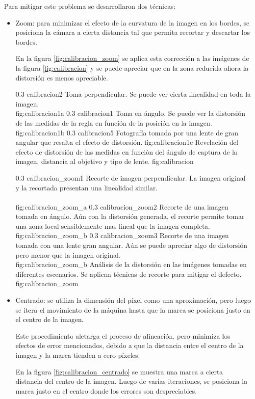 Para mitigar este problema se desarrollaron dos técnicas:
\begin{itemize}
\item{Zoom: para minimizar el efecto de la curvatura de la imagen en los bordes, se posiciona la cámara a cierta distancia tal que permita recortar y descartar los bordes.\par
      En la figura \ref{fig:calibracion_zoom} se aplica esta corrección a las imágenes de la figura \ref{fig:calibracion} y se puede apreciar que en la zona reducida ahora la distorsión es menos apreciable.}

\subfigabc
   {0.3} {calibracion2} {Toma perpendicular. Se puede ver cierta linealidad en toda la imagen.\\ \vphantom{1}} {fig:calibracion1a}
   {0.3} {calibracion1} {Toma en ángulo. Se puede ver la distorsión de las medidas de la regla en función de la posición en la imagen.} {fig:calibracion1b}
   {0.3} {calibracion5} {Fotografía tomada por una lente de gran angular que resalta el efecto de distorsión.} {fig:calibracion1c}
   {Revelación del efecto de distorsión de las medidas en función del ángulo de captura de la imagen, distancia al objetivo y tipo de lente.}
   {fig:calibracion}

\subfigabc
{0.3} {calibracion_zoom1} {Recorte de imagen perpendicular. La imagen original y la recortada presentan una linealidad similar.\\ \vphantom{1}\\ \vphantom{1}} {fig:calibracion_zoom_a}
   {0.3} {calibracion_zoom2} {Recorte de una imagen tomada en ángulo. Aún con la distorsión generada, el recorte permite tomar una zona local sensiblemente mas lineal que la imagen completa.} {fig:calibracion_zoom_b}
   {0.3} {calibracion_zoom3} {Recorte de una imagen tomada con una lente gran angular. Aún se puede apreciar algo de distorsión pero menor que la imagen original.\\ \vphantom{1}} {fig:calibracion_zoom_b}
   {Análisis de la distorsión en las imágenes tomadas en diferentes escenarios. Se aplican técnicas de recorte para mitigar el defecto.}
   {fig:calibracion_zoom}

   \item{Centrado: se utiliza la dimensión del píxel como una aproximación, pero luego se itera el movimiento de la máquina hasta que la marca se posiciona justo en el centro de la imagen.\par
         Este procedimiento aletarga el proceso de alineación, pero minimiza los efectos de error mencionados, debido a que la distancia entre el centro de la imagen y la marca tienden a cero píxeles.\par
         En la figura \ref{fig:calibracion_centrado} se muestra una marca a cierta distancia del centro de la imagen. Luego de varias iteraciones, se posiciona la marca justo en el centro donde los errores son despreciables.}
   \end{itemize}

